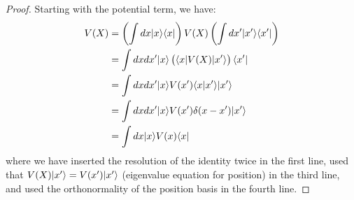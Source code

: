 \begin{proof}
    Starting with the potential term, we have:
    \begin{equation}
        \begin{split}
            V(X) &= \left(\int dx \lvert x \rangle \langle x \rvert\right)V(X)\left(\int dx' \lvert x' \rangle \langle x' \rvert\right)
            \\ &= \int dxdx' \lvert x \rangle\left(\langle x \rvert V(X)\lvert x' \rangle\right)\langle x' \rvert
            \\ &= \int dxdx' \lvert x \rangle V(x')\langle x \lvert x' \rangle\lvert x' \rangle
            \\ &= \int dxdx' \lvert x \rangle V(x')\delta(x-x')\lvert x' \rangle
            \\ &= \int dx \lvert x \rangle V(x)\langle x \rvert
        \end{split}
    \end{equation}
    where we have inserted the resolution of the identity twice in the first line, used that $V(X)\lvert x' \rangle = V(x')\lvert x' \rangle$ (eigenvalue equation for position) in the third line, and used the orthonormality of the position basis in the fourth line.


\end{proof}
